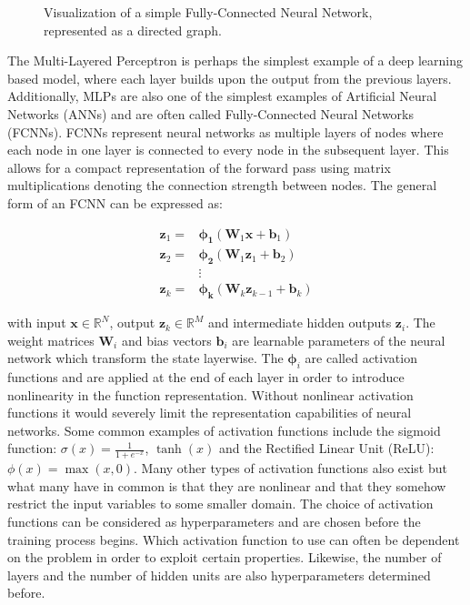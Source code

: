 \begin{figure}[H]
    \centering
    
    \caption{Visualization of a simple Fully-Connected Neural Network, represented as a directed graph.}
    \label{fig:ann}
\end{figure}

The Multi-Layered Perceptron is perhaps the simplest example of a deep learning based model, where each layer builds upon the output from the previous layers. Additionally, MLPs are also one of the simplest examples of Artificial Neural Networks (ANNs) and are often called Fully-Connected Neural Networks (FCNNs). FCNNs represent neural networks as multiple layers of nodes where each node in one layer is connected to every node in the subsequent layer. This allows for a compact representation of the forward pass using matrix multiplications denoting the connection strength between nodes. The general form of an FCNN can be expressed as:

\begin{equation}
    \begin{split}
        \bm{z}_1 = & \bm{\phi_1}(\bm{W}_1 \bm{x} + \bm{b}_1) \\
        \bm{z}_2 = & \bm{\phi_2}(\bm{W}_1 \bm{z}_1 + \bm{b}_2) \\
        & \vdots \\
        \bm{z}_k = & \bm{\phi_k}(\bm{W}_k \bm{z}_{k-1} + \bm{b}_k)
    \end{split}
    \label{eq:ann_forward}
\end{equation}

\noindent with input $\bm{x} \in \mathbb{R}^N$, output $\bm{z}_k \in \mathbb{R}^M$ and intermediate hidden outputs $\bm{z}_i$. The weight matrices $\bm{W}_i$ and bias vectors $\bm{b}_i$ are learnable parameters of the neural network which transform the state layerwise. The $\bm{\phi}_i$ are called activation functions and are applied at the end of each layer in order to introduce nonlinearity in the function representation. Without nonlinear activation functions it would severely limit the representation capabilities of neural networks. Some common examples of activation functions include the sigmoid function: $\sigma(x) = \frac{1}{1 + e^{-x}}$, $\tanh(x)$ and the Rectified Linear Unit (ReLU): $\phi(x) = \max(x, 0)$. Many other types of activation functions also exist but what many have in common is that they are nonlinear and that they somehow restrict the input variables to some smaller domain. The choice of activation functions can be considered as hyperparameters and are chosen before the training process begins. Which activation function to use can often be dependent on the problem in order to exploit certain properties. Likewise, the number of layers and the number of hidden units are also hyperparameters determined before.


